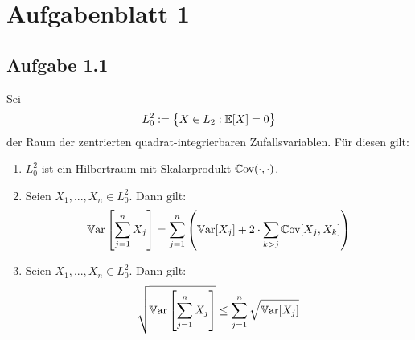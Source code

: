 
\section{Aufgabenblatt 1}
\subsection{Aufgabe 1.1}
Sei
\begin{align*}
	L_0^2:=\big\lbrace X\in L_2:\mathbb{E}[X]=0\big\rbrace
\end{align*}
der Raum der zentrierten quadrat-integrierbaren Zufallsvariablen. 
Für diesen gilt:
\begin{enumerate}[label=\alph*)]
	\item $L_0^2$ ist ein Hilbertraum mit Skalarprodukt $\mathbb{C}\text{ov}(\cdot,\cdot)$.
	\item Seien $X_1,...,X_n\in L_0^2$. Dann gilt:
	\begin{align*}
		\mathbb{V}\text{ar}\left[\sum\limits_{j=1}^n X_j\right]
		=\sum\limits_{j=1}^n\left(\mathbb{V}\text{ar}[X_j]+2\cdot\sum\limits_{k>j}\mathbb{C}\text{ov}[X_j,X_k]\right)
	\end{align*}
	\item Seien $X_1,...,X_n\in L_0^2$. Dann gilt:
	\begin{align*}
		\sqrt{\mathbb{V}\text{ar}\left[\sum\limits_{j=1}^n X_j\right]}\leq\sum\limits_{j=1}^n \sqrt{\mathbb{V}\text{ar}[X_j]}
	\end{align*}
\end{enumerate}

